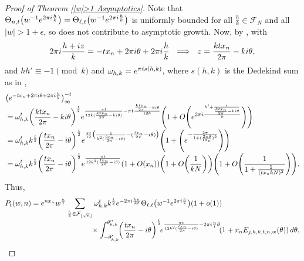 \documentclass[11pt]{article}
\numberwithin{equation}{section}
\begin{document}
\begin{proof}[Proof of Theorem \ref{|w|>1 Asymptotics}]
 Note that $\Theta_{n,t}\big(w^{-1}{\rm e}^{2\pi {\rm i} \frac{h}{k}}\big)=\Theta_{\ell,t}\big(w^{-1}{\rm e}^{2\pi {\rm i} \frac{h}{k}}\big)$ is uniformly bounded for all $\frac{h}{k} \in \mathcal{F}_N$ and all $|w|>1+\epsilon$, so does not contribute to asymptotic growth. Now, by \cite[equation~(5.2.2)]{Andrews}, with
 \begin{align*}
 2\pi {\rm i} \frac{h+{\rm i}z}{k}=-tx_n+2\pi {\rm i} \theta+2\pi {\rm i} \frac{h}{k} \ \implies\  z=\frac{ktx_n}{2\pi}-k{\rm i}\theta,
 \end{align*}
 and $hh' \equiv -1 \pmod{k}$ and $\omega_{h,k}={\rm e}^{\pi {\rm i} s(h,k)}$, where $s(h,k)$ is the Dedekind sum as in \cite[equation~(5.2.4)]{Andrews},
\begin{align*}
 &\big({\rm e}^{-tx_n+2\pi {\rm i} \theta+2\pi {\rm i} \frac{h}{k}}\big)_{\infty}^{-t} \\[-1mm]
 &{}= \omega_{h,k}^t \biggl(\frac{ktx_n}{2\pi}-k{\rm i}\theta\biggr)^{\frac{t}{2}}{\rm e}^{\frac{\pi t}{12k(\frac{ktx_n}{2\pi}-k{\rm i}\theta)}-\pi t\frac{\frac{ktx_n}{2\pi}-k{\rm i}\theta}{12k}}\Biggl(1+O\Biggl( {\rm e}^{2\pi {\rm i}\frac{h'+\frac{{\rm i}}{\frac{ktx_n}{2\pi}-k{\rm i}\theta}}{k}}\Biggr) \Biggr) \\[-1mm]
 &{}= \omega_{h,k}^t k^{\frac{t}{2}} \biggl(\frac{tx_n}{2\pi}-{\rm i}\theta\biggr)^{\frac{t}{2}}{\rm e}^{\frac{\pi t}{12}\big(\frac{1}{k^2(\frac{tx_n}{2\pi}-{\rm i}\theta)}-(\frac{tx_n}{2\pi}-{\rm i}\theta)\big)}\Biggl(1+\Biggl( {\rm e}^{- \frac{2\pi}{1+(\frac{2\pi\theta}{tx_n})^2}}\Biggr) \Biggr) \\[-1mm]
 &{}= \omega_{h,k}^t k^{\frac{t}{2}} \biggl(\frac{tx_n}{2\pi}-{\rm i}\theta\biggr)^{\frac{t}{2}}{\rm e}^{\frac{\pi t}{12k^2(\frac{tx_n}{2\pi}-{\rm i}\theta)}}(1+O(x_n)) \biggl(1+O\biggl(\frac{1}{kN}\biggr) \biggr) \Biggl(1+O\Biggl( \frac{1}{1+\frac{1}{(tx_nkN)^2}}\Biggr) \Biggr).
\end{align*}
Thus,
 \begin{align}
 P_t(w,n) &{}={\rm e}^{nx_n}w^{\frac{n}{t}} \sum_{\frac{h}{k} \in \mathcal{F}_{\lfloor \sqrt{n} \rfloor}} \omega_{h,k}^tk^{\frac{t}{2}}{\rm e}^{-2\pi {\rm i} \frac{hn}{kt}}\Theta_{\ell,t}\big(w^{-1}{\rm e}^{2\pi {\rm i} \frac{h}{k}}\big)(1+o(1)) \label{E:CircleMethodSeries}\\[-1mm]
 &\hphantom{={\rm e}^{nx_n}w^{\frac{n}{t}} \sum_{\frac{h}{k} \in \mathcal{F}_{\lfloor \sqrt{n} \rfloor}}}{}
 \times \int_{-\theta_{h,k}'}^{\theta_{h,k}''} \! \biggl(\frac{tx_n}{2\pi}-{\rm i}\theta\biggr)^{\frac{t}{2}}\!{\rm e}^{\frac{\pi t}{12k^2(\frac{tx_n}{2\pi}-{\rm i}\theta)}-2\pi {\rm i} \frac{n}{t} \theta}\! (1+x_n E_{j,h,k,t,n,w}(\theta))\, {\rm d}\theta, \nonumber

\end{align}
\end{proof}
\end{document}
